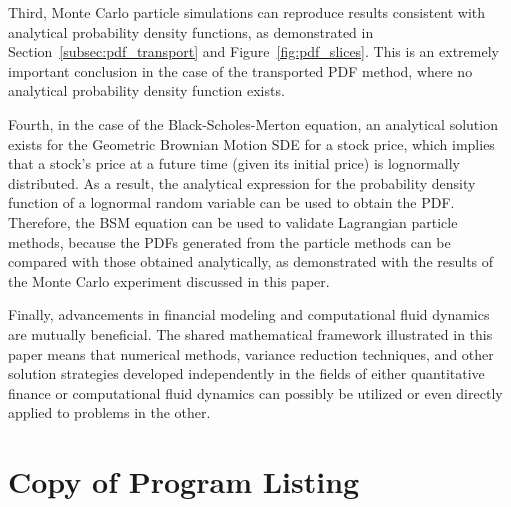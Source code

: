 \documentclass[12pt, onecolumn, journal]{IEEEtran}
\begin{document}
Third, Monte Carlo particle simulations can reproduce results consistent with analytical probability density functions, as demonstrated in Section~\ref{subsec:pdf_transport} and Figure~\ref{fig:pdf_slices}. This is an extremely important conclusion in the case of the transported PDF method, where no analytical probability density function exists.

Fourth, in the case of the Black-Scholes-Merton equation, an analytical solution exists for the Geometric Brownian Motion SDE for a stock price, which implies that a stock's price at a future time (given its initial price) is lognormally distributed. As a result, the analytical expression for the probability density function of a lognormal random variable can be used to obtain the PDF. Therefore, the BSM equation can be used to validate Lagrangian particle methods, because the PDFs generated from the particle methods can be compared with those obtained analytically, as demonstrated with the results of the Monte Carlo experiment discussed in this paper.

Finally, advancements in financial modeling and computational fluid dynamics are mutually beneficial. The shared mathematical framework illustrated in this paper means that numerical methods, variance reduction techniques, and other solution strategies developed independently in the fields of either quantitative finance or computational fluid dynamics can possibly be utilized or even directly applied to problems in the other.

\nocite{*}
\newpage



\newpage
\appendix
\section{Copy of Program Listing}

\end{document}
